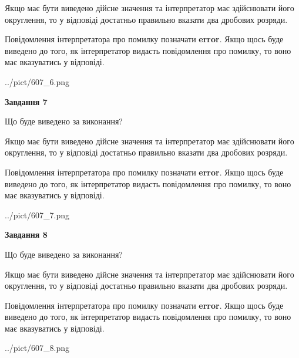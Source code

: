 \documentclass[12pt, ukrainian]{article}
\begin{document}
{\begin {Large}
Якщо має бути виведено дійсне значення та інтерпретатор має здійснювати його округлення, 
то у відповіді достатньо правильно вказати два дробових розряди.

Повідомлення інтерпретатора про помилку позначати \textbf{error}.
Якщо щось буде виведено до того, як інтерпретатор видасть повідомлення про помилку, 
то воно має вказуватись у відповіді. \par

\begin{center}
	{../pict/607_6.png}
\end{center}
\newpage

{\begin {center}\textbf{Завдання 7}\end {center}}\par
Що буде виведено за виконання? \par

Якщо має бути виведено дійсне значення та інтерпретатор має здійснювати його округлення, 
то у відповіді достатньо правильно вказати два дробових розряди.

Повідомлення інтерпретатора про помилку позначати \textbf{error}.
Якщо щось буде виведено до того, як інтерпретатор видасть повідомлення про помилку, 
то воно має вказуватись у відповіді. \par

\begin{center}
	{../pict/607_7.png}
\end{center}
\newpage

{\begin {center}\textbf{Завдання 8}\end {center}}\par
Що буде виведено за виконання? \par

Якщо має бути виведено дійсне значення та інтерпретатор має здійснювати його округлення, 
то у відповіді достатньо правильно вказати два дробових розряди.

Повідомлення інтерпретатора про помилку позначати \textbf{error}.
Якщо щось буде виведено до того, як інтерпретатор видасть повідомлення про помилку, 
то воно має вказуватись у відповіді. \par

\begin{center}
	{../pict/607_8.png}
\end{center}
\newpage


\end{Large}}
\end{document}
